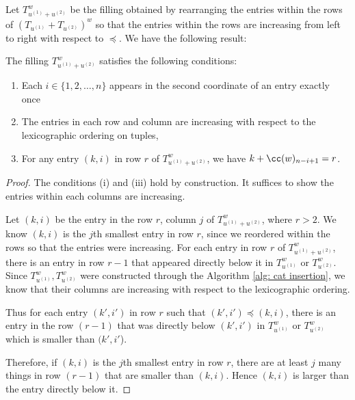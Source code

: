 Let $T^w_{u^{(1)}+ u^{(2)}}$ be the filling obtained by rearranging the entries within the rows of $(T_{u^{(1)}}+T_{u^{(2)}})^w$ so that the entries within the rows are increasing from left to right with respect to $\preceq$.
We have the following result:
\begin{lemma}\label{lemma:row column increase}
    The filling $T^w_{u^{(1)}+ u^{(2)}}$ satisfies the following conditions:

    \begin{enumerate}[label=(\roman*)]
        \item \label{cond: i} Each $i \in \{1,2,\dots, n\}$ appears in the second coordinate of an entry exactly once 
        \item \label{cond: ii}The entries in each row and column are increasing with respect to the lexicographic ordering on tuples,
        \item \label{cond: iii}For any entry $(k,i)$ in row $r$ of $T^w_{u^{(1)}+ u^{(2)}}$, we have $k + \cc(w)_{n-i+1} = r$.
\end{enumerate}
\end{lemma}
\begin{proof}
    The conditions (i) and (iii) hold by construction. It suffices to show the entries within each columns are increasing. 
    
    Let $(k,i)$ be the entry in the row $r$, column $j$ of $T^w_{u^{(1)}+ u^{(2)}}$, where $r>2$. We know $(k,i)$ is the $j$th smallest entry in row $r$, since we reordered within the rows so that the entries were increasing.
    For each entry in row $r$ of $T^w_{u^{(1)}+ u^{(2)}}$, there is an entry in row $r-1$ that appeared directly below it in $T^w_{u^{(1)}}$ or $T^w_{u^{(2)}}$. Since $T^w_{u^{(1)}}, T^w_{u^{(2)}}$ were constructed through the Algorithm \ref{alg: cat insertion}, we know that their columns are increasing with respect to the lexicographic ordering. 
    
    Thus for each entry $(k',i')$ in row $r$ such that $(k',i')\preceq (k,i)$, there is an entry in the row $(r-1)$ that was directly below $(k',i')$ in $T^w_{u^{(1)}}$ or $T^w_{u^{(2)}}$ which is smaller than $(k',i'$). 
    
    Therefore, if $(k,i)$ is the $j$th smallest entry in row $r$, there are at least $j$ many things in row $(r-1)$ that are smaller than $(k,i)$. Hence $(k,i)$ is larger than the entry directly below it.
\end{proof}

